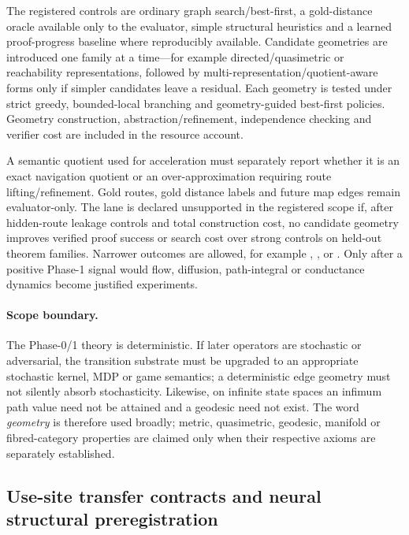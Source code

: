 The registered controls are ordinary graph search/best-first, a gold-distance oracle available only to the evaluator, simple structural heuristics and a learned proof-progress baseline where reproducibly available. Candidate geometries are introduced one family at a time---for example directed/quasimetric or reachability representations, followed by multi-representation/quotient-aware forms only if simpler candidates leave a residual. Each geometry is tested under strict greedy, bounded-local branching and geometry-guided best-first policies. Geometry construction, abstraction/refinement, independence checking and verifier cost are included in the resource account.

A semantic quotient used for acceleration must separately report whether it is an exact navigation quotient or an over-approximation requiring route lifting/refinement. Gold routes, gold distance labels and future map edges remain evaluator-only. The lane is declared unsupported in the registered scope if, after hidden-route leakage controls and total construction cost, no candidate geometry improves verified proof success or search cost over strong controls on held-out theorem families. Narrower outcomes are allowed, for example , , or . Only after a positive Phase-1 signal would flow, diffusion, path-integral or conductance dynamics become justified experiments.

\paragraph{Scope boundary.}
The Phase-0/1 theory is deterministic. If later operators are stochastic or adversarial, the transition substrate must be upgraded to an appropriate stochastic kernel, MDP or game semantics; a deterministic edge geometry must not silently absorb stochasticity. Likewise, on infinite state spaces an infimum path value need not be attained and a geodesic need not exist. The word \emph{geometry} is therefore used broadly; metric, quasimetric, geodesic, manifold or fibred-category properties are claimed only when their respective axioms are separately established.

\subsection{Use-site transfer contracts and neural structural preregistration}
\label{sec:vtg_use_and_neural_prereg}

